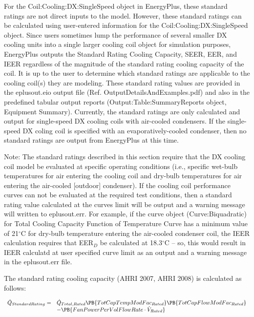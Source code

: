 For the Coil:Cooling:DX:SingleSpeed object in EnergyPlus, these standard ratings are not direct inputs to the model. However, these standard ratings can be calculated using user-entered information for the Coil:Cooling:DX:SingleSpeed object. Since users sometimes lump the performance of several smaller DX cooling units into a single larger cooling coil object for simulation purposes, EnergyPlus outputs the Standard Rating Cooling Capacity, SEER, EER, and IEER regardless of the magnitude of the standard rating cooling capacity of the coil. It is up to the user to determine which standard ratings are applicable to the cooling coil(s) they are modeling. These standard rating values are provided in the eplusout.eio output file (Ref. OutputDetailsAndExamples.pdf) and also in the predefined tabular output reports (Output:Table:SummaryReports object, Equipment Summary). Currently, the standard ratings are only calculated and output for single-speed DX cooling coils with air-cooled condensers. If the single-speed DX coling coil is specified with an evaporatively-cooled condenser, then no standard ratings are output from EnergyPlus at this time.

Note: The standard ratings described in this section require that the DX cooling coil model be evaluated at specific operating conditions (i.e., specific wet-bulb temperatures for air entering the cooling coil and dry-bulb temperatures for air entering the air-cooled {[}outdoor{]} condenser). If the cooling coil performance curves can not be evaluated at the required test conditions, then a standard rating value calculated at the curves limit will be output and a warning message will written to eplusout.err. For example, if the curve object (Curve:Biquadratic) for Total Cooling Capacity Function of Temperature Curve has a minimum value of 21\(^{\circ}\)C for dry-bulb temperature entering the air-cooled condenser coil, the IEER calculation requires that EER\(_{D}\) be calculated at 18.3\(^{\circ}\)C -- so, this would result in IEER calculatd at user specified curve limit as an output and a warning message in the eplusout.err file.

The standard rating cooling capacity (AHRI 2007, AHRI 2008) is calculated as follows:

\begin{equation}
\begin{array}{rl}
\dot{Q}_{StandardRating} =& \dot{Q}_{Total,Rated}\PB{TotCapTempModFac_{Rated}}\PB{TotCapFlowModFac_{Rated}} \\
 & - \PB{FanPowerPerVolFlowRate \cdot \dot{V}_{Rated}}
\end{array}
\end{equation}

